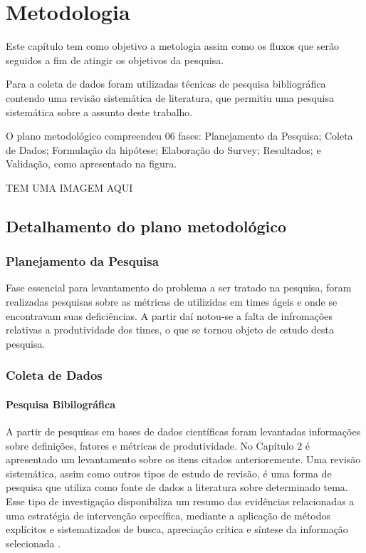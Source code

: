 \chapter[Metodologia]{Metodologia}
  Este capítulo tem como objetivo a metologia assim como os fluxos que serão
  seguidos a fim de atingir os objetivos da pesquisa.

  Para a coleta de dados foram utilizadas técnicas de pesquisa bibliográfica
  contendo uma revisão sistemática de literatura, que permitiu uma pesquisa sistemática
  sobre a assunto deste trabalho.

  O plano metodológico compreendeu 06 fases: Planejamento da Pesquisa; Coleta de Dados; Formulação da hipótese;
  Elaboração do Survey; Resultados; e Validação, como apresentado na figura.

  TEM UMA IMAGEM AQUI

\section{Detalhamento do plano metodológico}
\subsection{Planejamento da Pesquisa}
  Fase essencial para levantamento do problema a ser tratado na pesquisa, foram realizadas pesquisas sobre
  as métricas de utilizidas em times ágeis e onde se encontravam suas deficiências. A partir daí notou-se a falta de infromações
  relativas a produtividade dos times, o que se tornou objeto de estudo desta pesquisa.
\subsection{Coleta de Dados}
\subsubsection{Pesquisa Bibilográfica}
  A partir de pesquisas em bases de dados científicas foram levantadas informações sobre definições,
  fatores e métricas de produtividade. No Capítulo 2 é apresentado um levantamento sobre os itens citados anterioremente.
Uma revisão sistemática, assim como outros tipos de estudo de revisão, é uma
forma de pesquisa que utiliza como fonte de dados a literatura sobre determinado
tema. Esse tipo de investigação disponibiliza um resumo das evidências
relacionadas a uma estratégia de intervenção específica, mediante a aplicação
de métodos explícitos e sistematizados de busca, apreciação crítica e síntese
da informação selecionada \cite{SAMPAIO2007}.

